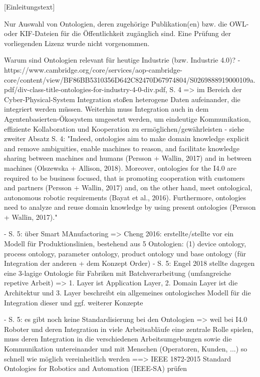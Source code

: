 \documentclass{article}
\begin{document}
[Einleitungstext]

Nur Auswahl von Ontologien, deren zugehörige Publikation(en) bzw. die OWL- oder KIF-Dateien für die Öffentlichkeit zugänglich sind.
Eine Prüfung der vorliegenden Lizenz wurde nicht vorgenommen.


Warum sind Ontologien relevant für heutige Industrie (bzw. Industrie 4.0)?
- https://www.cambridge.org/core/services/aop-cambridge-core/content/view/BF86BB5310356D642C82470D67974804/S0269888919000109a.pdf/div-class-title-ontologies-for-industry-4-0-div.pdf, S. 4 => im Bereich der Cyber-Physical-System Integration stoßen heterogene Daten aufeinander, die integriert werden müssen. Weiterhin muss Integration auch in dem Agentenbasierten-Ökosystem umgesetzt werden, um eindeutige Kommunikation, effiziente Kollaboration und Kooperation zu ermöglichen/gewährleisten
- siehe zweiter Absatz S. 4: "Indeed, ontologies aim
 to make domain knowledge explicit and remove ambiguities, enable machines to reason, and facilitate
 knowledge sharing between machines and humans (Persson + Wallin, 2017) and in between machines
 (Olszewska + Allison, 2018). Moreover, ontologies for the I4.0 are required to be business focused, that
 is promoting cooperation with customers and partners (Persson + Wallin, 2017) and, on the other hand,
 meet ontological, autonomous robotic requirements (Bayat et al., 2016). Furthermore, ontologies need to
 analyze and reuse domain knowledge by using present ontologies (Persson + Wallin, 2017)."

- S. 5: über Smart MAnufactoring => Cheng 2016: erstellte/stellte vor ein Modell für Produktionslinien, bestehend aus 5 Ontologien: (1) device ontology, process ontology, parameter ontology, product ontology und base ontology (für Integration der anderen + dem Konzept Order)
- S. 5: Engel 2018 stellte dagegen eine 3-lagige Ontologie für Fabriken mit Batchverarbeitung (umfangreiche repetive Arbeit) => 1. Layer ist Application Layer, 2. Domain Layer ist die Architektur und 3. Layer beschreibt ein allgemeines ontologisches Modell für die Integration dieser und ggf. weiterer Konzepte

- S. 5: es gibt noch keine Standardisierung bei den Ontologien => weil bei I4.0 Roboter und deren Integration in viele Arbeitsabläufe eine zentrale Rolle spielen, muss deren Integration in die verschiedenen Arbeitsumgebungen sowie die Kommunikation untereinander und mit Menschen (Operatoren, Kunden, ...) so schnell wie möglich vereinheitlich werden ==> IEEE 1872-2015 Standard Ontologies for Robotics and Automation (IEEE-SA) prüfen
\end{document}
